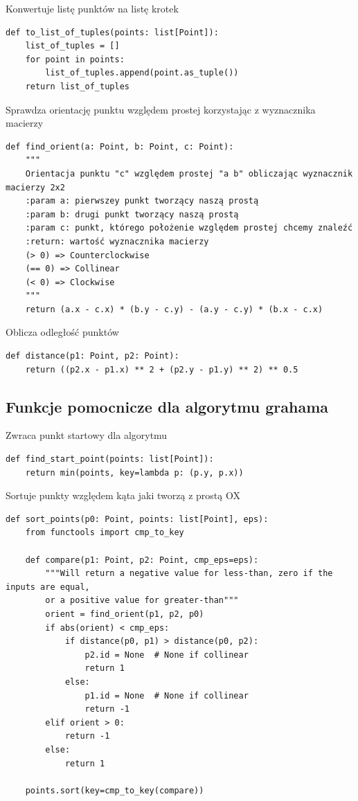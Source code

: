 \documentclass[12pt]{article}
\begin{document}
\mbox{}
\par Konwertuje listę punktów na listę krotek
\begin{Verbatim}
def to_list_of_tuples(points: list[Point]):
	list_of_tuples = []
	for point in points:
		list_of_tuples.append(point.as_tuple())
	return list_of_tuples
\end{Verbatim}

\mbox{}
\par Sprawdza orientację punktu względem prostej korzystając z wyznacznika macierzy
\begin{Verbatim}
def find_orient(a: Point, b: Point, c: Point):
	"""
	Orientacja punktu "c" względem prostej "a b" obliczając wyznacznik macierzy 2x2
	:param a: pierwszey punkt tworzący naszą prostą
	:param b: drugi punkt tworzący naszą prostą
	:param c: punkt, którego położenie względem prostej chcemy znaleźć
	:return: wartość wyznacznika macierzy
	(> 0) => Counterclockwise
	(== 0) => Collinear
	(< 0) => Clockwise
	"""
	return (a.x - c.x) * (b.y - c.y) - (a.y - c.y) * (b.x - c.x)
\end{Verbatim}

\newpage

\par Oblicza odległość punktów
\begin{Verbatim}
def distance(p1: Point, p2: Point):
	return ((p2.x - p1.x) ** 2 + (p2.y - p1.y) ** 2) ** 0.5
\end{Verbatim}

\mbox{}
\subsection*{Funkcje pomocnicze dla algorytmu grahama}

\par Zwraca punkt startowy dla algorytmu
\begin{Verbatim}
def find_start_point(points: list[Point]):
	return min(points, key=lambda p: (p.y, p.x))
\end{Verbatim}

\mbox{}
\par Sortuje punkty względem kąta jaki tworzą z prostą OX
\begin{Verbatim}
def sort_points(p0: Point, points: list[Point], eps):
	from functools import cmp_to_key
	
	def compare(p1: Point, p2: Point, cmp_eps=eps):
		"""Will return a negative value for less-than, zero if the inputs are equal, 
		or a positive value for greater-than"""
		orient = find_orient(p1, p2, p0)
		if abs(orient) < cmp_eps:
			if distance(p0, p1) > distance(p0, p2):
				p2.id = None  # None if collinear
				return 1
			else:
				p1.id = None  # None if collinear
				return -1
		elif orient > 0:
			return -1
		else:
			return 1

	points.sort(key=cmp_to_key(compare))
\end{Verbatim}
\end{document}

